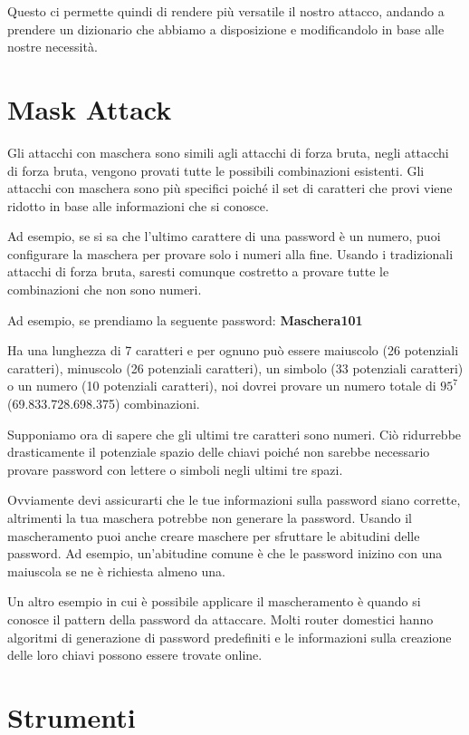 Questo ci permette quindi di rendere più versatile il nostro attacco, andando a prendere un dizionario che abbiamo a disposizione e modificandolo in base alle nostre necessità.

\section{Mask Attack}
Gli attacchi con maschera \cite{Mask_attack} sono simili agli attacchi di forza bruta, negli attacchi di forza bruta, vengono provati tutte le possibili combinazioni esistenti. Gli attacchi con maschera sono più specifici poiché il set di caratteri che provi viene ridotto in base alle informazioni che si conosce.

Ad esempio, se si sa che l'ultimo carattere di una password è un numero, puoi configurare la maschera per provare solo i numeri alla fine. Usando i tradizionali attacchi di forza bruta, saresti comunque costretto a provare tutte le combinazioni che non sono numeri.

Ad esempio, se prendiamo la seguente password: \textbf{Maschera101}

Ha una lunghezza di 7 caratteri e per ognuno può essere maiuscolo (26 potenziali caratteri), minuscolo (26 potenziali caratteri), un simbolo (33 potenziali caratteri) o un numero (10 potenziali caratteri), noi dovrei provare un numero totale di \({95}^{7}\) (69.833.728.698.375) combinazioni.

Supponiamo ora di sapere che gli ultimi tre caratteri sono numeri. Ciò ridurrebbe drasticamente il potenziale spazio delle chiavi poiché non sarebbe necessario provare password con lettere o simboli negli ultimi tre spazi.

Ovviamente devi assicurarti che le tue informazioni sulla password siano corrette, altrimenti la tua maschera potrebbe non generare la password. Usando il mascheramento puoi anche creare maschere per sfruttare le abitudini delle password. Ad esempio, un'abitudine comune è che le password inizino con una maiuscola se ne è richiesta almeno una.

Un altro esempio in cui è possibile applicare il mascheramento è quando si conosce il pattern della password da attaccare. Molti router domestici hanno algoritmi di generazione di password predefiniti e le informazioni sulla creazione delle loro chiavi possono essere trovate online.

\section{Strumenti}

